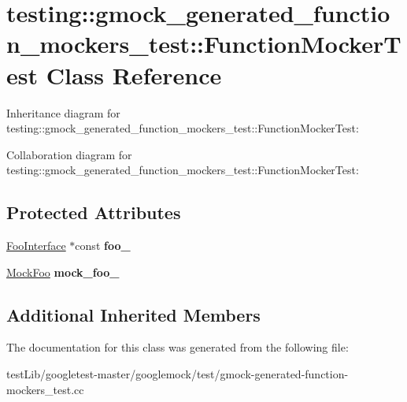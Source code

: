 \hypertarget{classtesting_1_1gmock__generated__function__mockers__test_1_1FunctionMockerTest}{}\section{testing\+:\+:gmock\+\_\+generated\+\_\+function\+\_\+mockers\+\_\+test\+:\+:Function\+Mocker\+Test Class Reference}
\label{classtesting_1_1gmock__generated__function__mockers__test_1_1FunctionMockerTest}


Inheritance diagram for testing\+:\+:gmock\+\_\+generated\+\_\+function\+\_\+mockers\+\_\+test\+:\+:Function\+Mocker\+Test\+:


Collaboration diagram for testing\+:\+:gmock\+\_\+generated\+\_\+function\+\_\+mockers\+\_\+test\+:\+:Function\+Mocker\+Test\+:
\subsection*{Protected Attributes}
\begin{DoxyCompactItemize}
\item 
\mbox{\label{classtesting_1_1gmock__generated__function__mockers__test_1_1FunctionMockerTest_ae2b8b577c4808f2dff9797168468f65f}} 
\hyperlink{classtesting_1_1gmock__generated__function__mockers__test_1_1FooInterface}{Foo\+Interface} $\ast$const {\bfseries foo\+\_\+}
\item 
\mbox{\label{classtesting_1_1gmock__generated__function__mockers__test_1_1FunctionMockerTest_a265659f07a0e75152ab295add4769585}} 
\hyperlink{classtesting_1_1gmock__generated__function__mockers__test_1_1MockFoo}{Mock\+Foo} {\bfseries mock\+\_\+foo\+\_\+}
\end{DoxyCompactItemize}
\subsection*{Additional Inherited Members}


The documentation for this class was generated from the following file\+:\begin{DoxyCompactItemize}
\item 
test\+Lib/googletest-\/master/googlemock/test/gmock-\/generated-\/function-\/mockers\+\_\+test.\+cc\end{DoxyCompactItemize}
